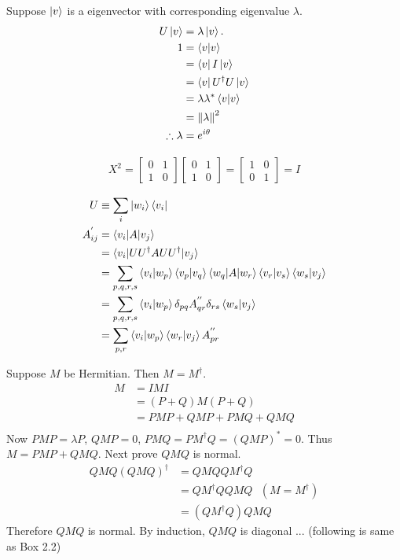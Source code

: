 
Suppose $\ket{v}$ is a eigenvector with corresponding eigenvalue $\lambda$.
\begin{align*}
	U \ket{v} &= \lambda \ket{v}.\\
	1 &= \braket{v | v}\\
	&= \bra{v} I \ket{v}\\
	&= \bra{v} U^\dagger U \ket{v}\\
	&= \lambda \lambda^* \braket{v | v}\\
	&= \left\lVert\lambda\right\rVert^2\\
	\therefore \lambda &= e^{i \theta}
\end{align*}




\begin{align*}
	X^2 = \begin{bmatrix}
		0 & 1 \\
		1 & 0
	\end{bmatrix}
	\begin{bmatrix}
		0 & 1 \\
		1 & 0
	\end{bmatrix}
	= \begin{bmatrix}
		1 & 0 \\
		0 & 1
	\end{bmatrix} = I
\end{align*}



\begin{align*}
	U &\equiv \sum_i \ket{w_i}\bra{v_i}\\
	A_{ij}^{'} &= \braket{v_i | A | v_j}\\
	&= \braket{v_i | UU^\dagger A UU^\dagger | v_j}\\
	&= \sum_{p,q,r,s} \braket{v_i | w_p} \braket{v_p | v_q} \braket{w_q | A | w_r} \braket{v_r | v_s} \braket{w_s | v_j}\\
	&= \sum_{p,q,r,s} \braket{v_i | w_p} \delta_{pq} A_{qr}^{''} \delta_{rs}  \braket{w_s | v_j}\\
	&= \sum_{p,r}  \braket{v_i | w_p}  \braket{w_r | v_j} A_{pr}^{''}
\end{align*}



Suppose $M$ be Hermitian. Then $M = M^\dagger$.
\begin{align*}
	M &= IMI\\
		&= (P+Q) M (P+Q)\\
		&= PMP + QMP + PMQ + QMQ\\
\end{align*}
Now $PMP = \lambda P$, $QMP = 0$, $PMQ = PM^\dagger Q = (QMP)^* = 0$.
Thus $M = PMP + QMQ$.
Next prove $QMQ$ is normal.
\begin{align*}
	QMQ (QMQ)^\dagger &= QMQ QM^\dagger Q\\
		&= QM^\dagger Q QMQ ~~~ (M = M^\dagger)\\
		&= (QM^\dagger Q) QMQ
\end{align*}
Therefore $QMQ$ is normal.
By induction, $QMQ$ is diagonal ... (following is same as Box 2.2)

